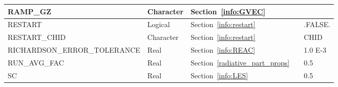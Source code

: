 \documentclass[11pt]{book}
\begin{document}
\begin{longtable}{@{\extracolsep{\fill}}|l|l|l|l|l|}
{\ct RAMP\_GZ}                                  & Character     & Section~\ref{info:GVEC}                               &               &                   \\ \hline
{\ct RESTART}                                   & Logical       & Section~\ref{info:restart}                            &               & {\ct .FALSE.}     \\ \hline
{\ct RESTART\_CHID}                             & Character     & Section~\ref{info:restart}                            &               & {\ct CHID}        \\ \hline
{\ct RICHARDSON\_ERROR\_TOLERANCE}              & Real          & Section~\ref{info:REAC}                               &               & 1.0 E-3           \\ \hline
{\ct RUN\_AVG\_FAC}                             & Real          & Section~\ref{radiative_part_props}                    &               & 0.5               \\ \hline
{\ct SC}                                        & Real          & Section~\ref{info:LES}                                &               & 0.5               \\ \hline

\end{longtable}
\end{document}
